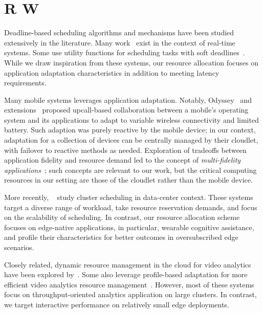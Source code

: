 \section{R W}
\label{sec: resource-management-related}

Deadline-based scheduling algorithms and mechanisms have been studied
extensively in the literature. Many work~\cite{tokuda1990real, kao1993deadline,
stankovic2012deadline, steiger2004operating} exist in the context of real-time
systems. Some use utility functions for scheduling tasks with soft
deadlines~\cite{ravindran2005recent, li2004utility}. While we draw
inspiration from these systems, our resource allocation focuses on application
adaptation characteristics in addition to meeting latency requirements.

Many mobile systems leverages application adaptation. Notably,
Odyssey~\cite{Noble1997} and extensions~\cite{Flinn1999} proposed upcall-based
collaboration between a mobile's operating system and its applications to adapt
to variable wireless connectivity and limited battery. Such adaption was purely
reactive by the mobile device; in our context, adaptation for a collection of
devices can be centrally managed by their cloudlet, with failover to reactive
methods as needed. Exploration of tradeoffs between application fidelity and
resource demand led to the concept of {\em multi-fidelity
applications}~\cite{Satya1999}; such concepts are relevant to our work, but the
critical computing resources in our setting are those of the cloudlet rather
than the mobile device.

More recently,
~\cite{boutin2014apollo,yao2014haste,verma2015large,ousterhout2013sparroW,delimitrou2014quasar,schwarzkopf2013omega}
study cluster scheduling in data-center context. These systems target a diverse
range of workload, take resource reservation demands, and focus on the
scalability of scheduling. In contrast, our resource allocation scheme focuses
on edge-native applications, in particular, wearable cognitive assistance, and
profile their characteristics for better outcomes in oversubscribed edge
scenarios.

Closely related, dynamic resource management in the cloud for video analytics
have been explored by~\cite{sembiring2013dynamic, fu2015drs, kaseb2015cloud}.
Some also leverage profile-based adaptation for more efficient video analytics
resource management~\cite{zhang2017live, hung2018videoedge, jiang2018chameleon}.
However, most of these systems focus on throughput-oriented analytics
application on large clusters. In contrast, we target interactive performance on
relatively small edge deployments.


